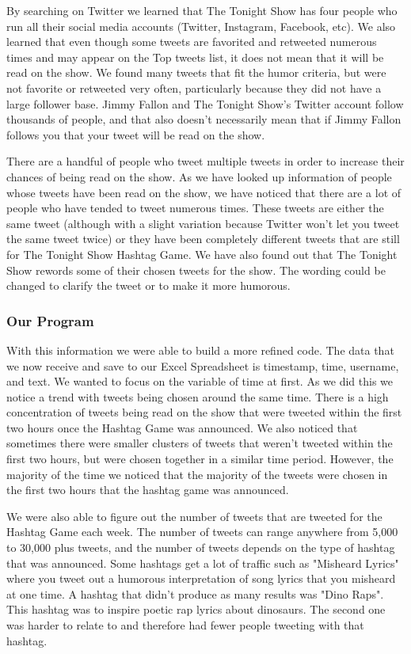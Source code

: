 \documentclass[titlepage]{article}
\begin{document}
By searching on Twitter we learned that The Tonight Show has four people who run all their social media accounts (Twitter, Instagram, Facebook, etc). We also learned that even though some tweets are favorited and retweeted numerous times and may appear on the Top tweets list, it does not mean that it will be read on the show. We found many tweets that fit the humor criteria, but were not favorite or retweeted very often, particularly because they did not have a large follower base. Jimmy Fallon and The Tonight Show's Twitter account follow thousands of people, and that also doesn't necessarily mean that if Jimmy Fallon follows you that your tweet will be read on the show. 

There are a handful of people who tweet multiple tweets in order to increase their chances of being read on the show. As we have looked up information of people whose tweets have been read on the show, we have noticed that there are a lot of people who have tended to tweet numerous times. These tweets are either the same tweet (although with a slight variation because Twitter won't let you tweet the same tweet twice) or they have been completely different tweets that are still for The Tonight Show Hashtag Game. We have also found out that The Tonight Show rewords some of their chosen tweets for the show. The wording could be changed to clarify the tweet or to make it more humorous. 

\subsubsection{Our Program}

With this information we were able to build a more refined code. The data that we now receive and save to our Excel Spreadsheet is timestamp, time, username, and text. We wanted to focus on the variable of time at first. As we did this we notice a trend with tweets being chosen around the same time. There is a high concentration of tweets being read on the show that were tweeted within the first two hours once the Hashtag Game was announced. We also noticed that sometimes there were smaller clusters of tweets that weren't tweeted within the first two hours, but were chosen together in a similar time period. However, the majority of the time we noticed that the majority of the tweets were chosen in the first two hours that the hashtag game was announced. 

We were also able to figure out the number of tweets that are tweeted for the Hashtag Game each week. The number of tweets can range anywhere from 5,000 to 30,000 plus tweets, and the number of tweets depends on the type of hashtag that was announced. Some hashtags get a lot of traffic such as "Misheard Lyrics" where you tweet out a humorous interpretation of song lyrics that you misheard at one time. A hashtag that didn't produce as many results was "Dino Raps". This hashtag was to inspire poetic rap lyrics about dinosaurs. The second one was harder to relate to and therefore had fewer people tweeting with that hashtag. 
\end{document}
